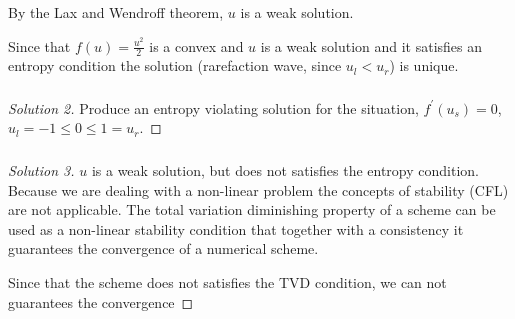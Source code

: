 \begin{frame}
\begin{proofs}[Solution 1]
    \end{proofs}
\end{frame}

\begin{frame}
    \frametitle{\secname}

    \begin{proofs}
        By the Lax and Wendroff theorem, $u$ is a weak solution.

        Since that $f\left(u\right)=\frac{u^{2}}{2}$ is a convex and
        $u$ is a weak solution and it satisfies an entropy condition
        the solution (rarefaction wave, since $u_l<u_r$) is unique.
    \end{proofs}
\end{frame}

\begin{frame}
    \frametitle{\secname}

    \begin{proof}[Solution 2]
        Produce an entropy violating solution for the situation,
        $f^{\prime}\left(u_{s}\right)=0$,
        $u_{l}=-1\leq 0\leq 1=u_{r}$.
    \end{proof}
\end{frame}

\begin{frame}
    \frametitle{\secname}

    \begin{proof}[Solution 3]
        $u$ is a weak solution, but does not satisfies the entropy condition.
        Because we are dealing with a non-linear problem the concepts of stability (CFL) are not applicable.
        The total variation diminishing property of a scheme can be used as a non-linear stability condition
        that together with a consistency it guarantees the convergence of a numerical scheme.

        Since that the scheme does not satisfies the TVD condition, we can not guarantees the convergence
    \end{proof}
\end{frame}